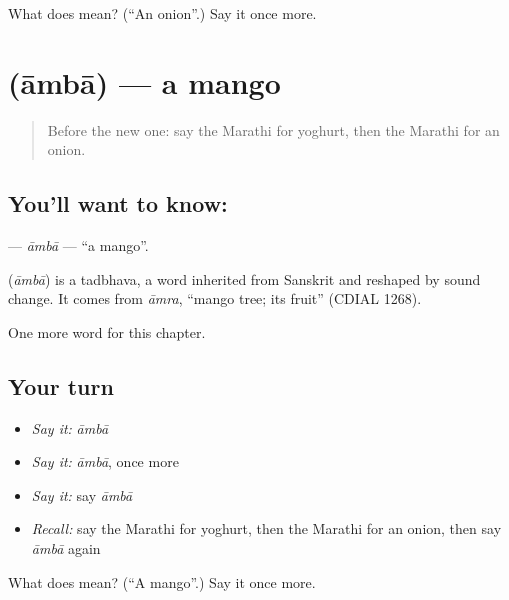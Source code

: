 \begin{tcolorbox}[breakable,colback=teal!4,colframe=teal!35!black,title={Before you move on}]
What does  mean? (\textquotedblleft{}An onion\textquotedblright{}.) Say it once more.
\end{tcolorbox}
\section[\texorpdfstring{\mr{आंबा} (āmbā)}{आंबा (āmbā)}]{ (āmbā) — a mango}

\label{lesson:MR-C89-amba}



\begin{quote}
Before the new one: say the Marathi for yoghurt, then the Marathi for an onion.
\end{quote}

\subsection*{You'll want to know: }
\textbf{} — \emph{āmbā} — \textquotedblleft{}a mango\textquotedblright{}.

\begin{cousinweb}
\textbf{} (\emph{āmbā}) is a tadbhava, a word inherited from Sanskrit and reshaped by sound change. It comes from \emph{āmra}, \textquotedblleft{}mango tree; its fruit\textquotedblright{} (CDIAL 1268).
\end{cousinweb}

\begin{grammarlens}[title={What you've built}]
One more word for this chapter.
\end{grammarlens}

\subsection*{Your turn}
\begin{itemize}
\raggedright
  \item \emph{Say it:} \emph{āmbā}
  \item \emph{Say it:} \emph{āmbā}, once more
  \item \emph{Say it:} say \emph{āmbā}
  \item \emph{Recall:} say the Marathi for yoghurt, then the Marathi for an onion, then say \emph{āmbā} again
\end{itemize}

\begin{tcolorbox}[breakable,colback=teal!4,colframe=teal!35!black,title={Before you move on}]
What does  mean? (\textquotedblleft{}A mango\textquotedblright{}.) Say it once more.
\end{tcolorbox}
